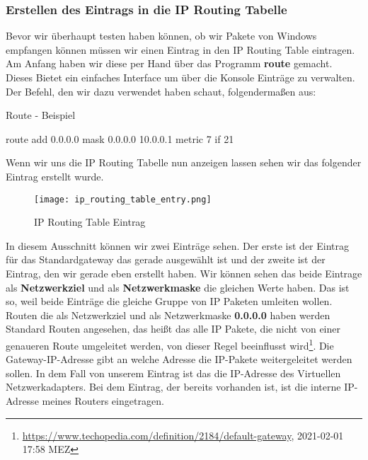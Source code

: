 \subsubsection{Erstellen des Eintrags in die IP Routing Tabelle}
Bevor wir überhaupt testen haben können, ob wir Pakete von Windows empfangen können müssen wir einen Eintrag in den IP Routing Table eintragen. Am Anfang haben wir diese per Hand über das Programm \textbf{route} gemacht. Dieses Bietet ein einfaches Interface um über die Konsole Einträge zu verwalten. Der Befehl, den wir dazu verwendet haben schaut, folgendermaßen aus:
\begin{program}[H]
\caption{Route - Beispiel}
\begin{GenericCode}
route add 0.0.0.0 mask 0.0.0.0 10.0.0.1 metric 7 if 21  
\end{GenericCode}
\end{program}
Wenn wir uns die IP Routing Tabelle nun anzeigen lassen sehen wir das folgender Eintrag erstellt wurde.
\begin{figure}[H]
    \centering
    \texttt{[image: ip\_routing\_table\_entry.png]}
    \caption[IP Routing Table Eintrag]{IP Routing Table Eintrag } 
\end{figure}
In diesem Ausschnitt können wir zwei Einträge sehen. Der erste ist der Eintrag für das Standardgateway das gerade ausgewählt ist und der zweite ist der Eintrag, den wir gerade eben erstellt haben. 
\newline
\newline
Wir können sehen das beide Eintrage als \textbf{Netzwerkziel} und als \textbf{Netzwerkmaske} die gleichen Werte haben. Das ist so, weil beide Einträge die gleiche Gruppe von IP Paketen umleiten wollen. Routen die als Netzwerkziel und als Netzwerkmaske \textbf{0.0.0.0} haben werden Standard Routen angesehen, das heißt das alle IP Pakete, die nicht von einer genaueren Route umgeleitet werden, von dieser Regel beeinflusst wird\footnote[1]{\url{https://www.techopedia.com/definition/2184/default-gateway}, 2021-02-01 17:58 MEZ}.
\newline
\newline
Die Gateway-IP-Adresse gibt an welche Adresse die IP-Pakete weitergeleitet werden sollen. In dem Fall von unserem Eintrag ist das die IP-Adresse des Virtuellen Netzwerkadapters. Bei dem Eintrag, der bereits vorhanden ist, ist die interne IP-Adresse meines Routers eingetragen.
\newline
\newline

